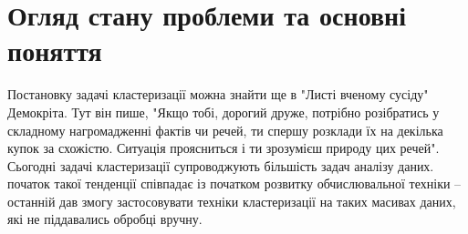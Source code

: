 \chapter{Огляд стану проблеми та основні поняття}\label{ch:01}

Постановку задачі кластеризації можна знайти ще в "Листі вченому сусіду" Демокріта. Тут він пише, "Якщо тобі, дорогий друже, потрібно розібратись у складному нагромадженні фактів чи речей, ти спершу розклади їх на декілька купок за схожістю. Ситуація проясниться і ти зрозумієш природу цих речей". 
Сьогодні задачі кластеризації супроводжують більшість задач аналізу даних. початок такої тенденції співпадає із початком розвитку обчислювальної техніки -- останній дав змогу застосовувати техніки кластеризації на таких масивах даних, які не піддавались обробці вручну.
